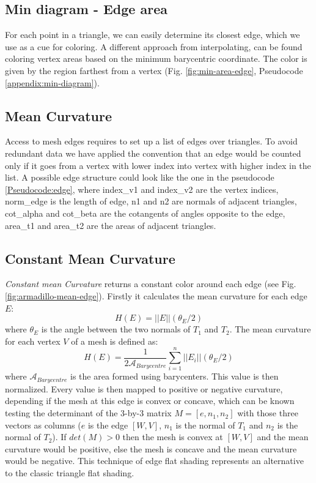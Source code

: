\subsection{Min diagram - Edge area} \label{section:min-diagram}
For each point in a triangle, we can easily determine its closest edge, which we use as a cue for coloring.
A different approach from interpolating, can be found coloring vertex areas based on the minimum barycentric coordinate.
The color is given by the region farthest from a vertex (Fig. \ref{fig:min-area-edge}, Pseudocode \ref{appendix:min-diagram}).

\subsection{Mean Curvature} \label{section:edge-struct} \label{section:mc-curvature}
Access to mesh edges requires to set up a list of edges over triangles. To avoid redundant data we have applied the convention that an edge would be counted only if it goes from a vertex with lower index into vertex with higher index in the list. A possible edge structure could look like the one in the pseudocode \ref{Pseudocode:edge}, where index\_v1 and index\_v2 are the vertex indices, norm\_edge is the length of edge, n1 and n2 are normals of adjacent triangles, cot\_alpha and cot\_beta are the cotangents of angles opposite to the edge, area\_t1 and area\_t2 are the areas of adjacent triangles.

\subsection{Constant Mean Curvature}
\textit{Constant mean Curvature} returns a constant color around each edge (see Fig. \ref{fig:armadillo-mean-edge}). Firstly it calculates the mean curvature for each edge $E$:
$$H(E) = || E|| (\theta_E /2)$$
where $\theta_E$ is the angle between the two normals of $T_1$ and $T_2$. The mean curvature for each vertex $V$ of a mesh is defined as:
$$H(E) = \frac{1}{2\mathcal{A}_{Barycentre}} \sum_{i = 1}^n ||E_i||(\theta_E/2)$$
where $\mathcal{A}_{Barycentre}$ is the area formed using barycenters. This value is then normalized. Every value is then mapped to positive or negative curvature, depending if the mesh at this edge is convex or concave, which can be known testing the determinant of the 3-by-3 matrix $M = [e, n_1, n_2]$ with those three vectors as
columns ($e$ is the edge $[W, V]$, $n_1$ is the normal of $T_1$ and $n_2$ is the normal of $T_2$). If $det(M) > 0$ then the mesh is convex at $[W, V]$ and the mean curvature would be positive, else the mesh is concave and the mean curvature would be negative. This technique of edge flat shading represents an alternative to the classic triangle flat shading.

